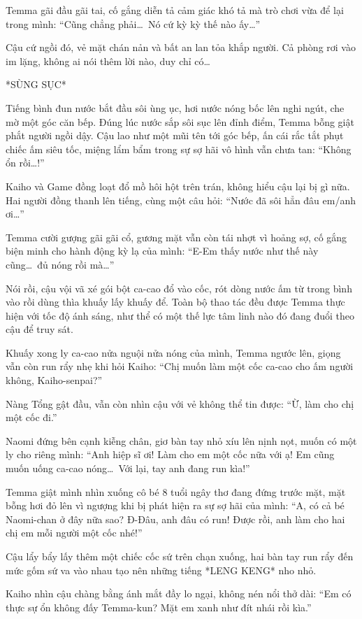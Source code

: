 \documentclass[../main.tex]{subfiles}
\begin{document}
Temma gãi đầu gãi tai, cố gắng diễn tả cảm giác khó tả mà trò chơi vừa để lại trong mình: ``Cũng chẳng phải\dots\ Nó cứ kỳ kỳ thế nào ấy\dots''

Cậu cứ ngồi đó, vẻ mặt chán nản và bất an lan tỏa khắp người. Cả phòng rơi vào im lặng, không ai nói thêm lời nào, duy chỉ có\dots

*SÙNG SỤC*

Tiếng bình đun nước bắt đầu sôi ùng ục, hơi nước nóng bốc lên nghi ngút, che mờ một góc căn bếp. Đúng lúc nước sắp sôi sục lên đỉnh điểm, Temma bỗng giật phắt người ngồi dậy. Cậu lao như một mũi tên tới góc bếp, ấn cái rắc tắt phụt chiếc ấm siêu tốc, miệng lẩm bẩm trong sự sợ hãi vô hình vẫn chưa tan: ``Không ổn rồi\dots!''

Kaiho và Game đồng loạt đổ mồ hôi hột trên trán, không hiểu cậu lại bị gì nữa. Hai người đồng thanh lên tiếng, cùng một câu hỏi: ``Nước đã sôi hẳn đâu em/anh ơi\dots''

Temma cười gượng gãi gãi cổ, gương mặt vẫn còn tái nhợt vì hoảng sợ, cố gắng biện minh cho hành động kỳ lạ của mình: ``E-Em thấy nước như thế này cũng\dots\ đủ nóng rồi mà\dots''

Nói rồi, cậu vội vã xé gói bột ca-cao đổ vào cốc, rót dòng nước ấm từ trong bình vào rồi dùng thìa khuấy lấy khuấy để. Toàn bộ thao tác đều được Temma thực hiện với tốc độ ánh sáng, như thể có một thế lực tâm linh nào đó đang đuổi theo cậu để truy sát.

Khuấy xong ly ca-cao nửa nguội nửa nóng của mình, Temma ngước lên, giọng vẫn còn run rẩy nhẹ khi hỏi Kaiho: ``Chị muốn làm một cốc ca-cao cho ấm người không, Kaiho-senpai?''

Nàng Tổng gật đầu, vẫn còn nhìn cậu với vẻ không thể tin được: ``Ừ, làm cho chị một cốc đi.''

Naomi đứng bên cạnh kiễng chân, giơ bàn tay nhỏ xíu lên nịnh nọt, muốn có một ly cho riêng mình: ``Anh hiệp sĩ ơi! Làm cho em một cốc nữa với ạ! Em cũng muốn uống ca-cao nóng\dots\ Với lại, tay anh đang run kìa!''

Temma giật mình nhìn xuống cô bé 8 tuổi ngây thơ đang đứng trước mặt, mặt bỗng hơi đỏ lên vì ngượng khi bị phát hiện ra sự sợ hãi của mình: ``A, có cả bé Naomi-chan ở đây nữa sao? Đ-Đâu, anh đâu có run! Được rồi, anh làm cho hai chị em mỗi người một cốc nhé!''

Cậu lẩy bẩy lấy thêm một chiếc cốc sứ trên chạn xuống, hai bàn tay run rẩy đến mức gốm sứ va vào nhau tạo nên những tiếng *LENG KENG* nho nhỏ.

Kaiho nhìn cậu chàng bằng ánh mắt đầy lo ngại, không nén nổi thở dài: ``Em có thực sự ổn không đấy Temma-kun? Mặt em xanh như đít nhái rồi kìa.''
\end{document}
